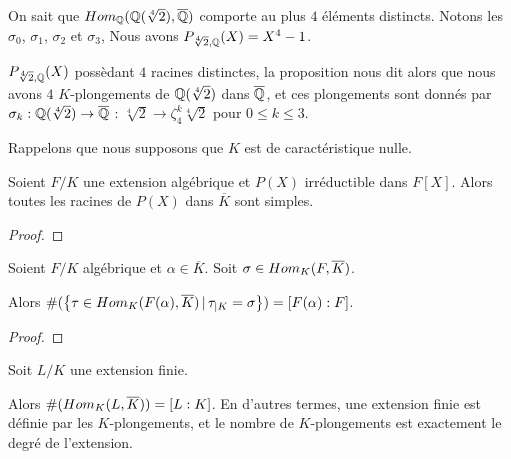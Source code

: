 \begin{exemple}
	On sait que
	$Hom_{\mathbb{Q}}(\mathbb{Q}(\sqrt[4]{2}), \overline{\mathbb{Q}})$
	comporte au plus $4$ éléments distincts. Notons les $\sigma_{0}$, $\sigma_{1}$,
	$\sigma_{2}$ et $\sigma_{3}$,
	Nous avons $P_{\sqrt[4]{2}, \mathbb{Q}}(X) = X^{4} - 1$.

	$P_{\sqrt[4]{2}, \mathbb{Q}}(X)$ possèdant $4$ racines distinctes, la
	proposition nous dit alors que nous avons $4$
	$K$-plongements de $\mathbb{Q}(\sqrt[4]{2})$ dans $\overline{\mathbb{Q}}$, et
	ces plongements sont donnés par
	$\sigma_{k} : \mathbb{Q}(\sqrt[4]{2}) \rightarrow \overline{\mathbb{Q}}$ :
	$\sqrt[4]{2} \rightarrow \zeta^{k}_{4} \sqrt[4]{2}$ pour $0 \leq k \leq 3$.
\end{exemple}

\begin{proposition}
	Rappelons que nous supposons que $K$ est de caractéristique nulle.

	Soient $F/K$ une extension algébrique et $P(X)$ irréductible dans $F[X]$.
	Alors toutes les racines de $P(X)$ dans $\overline{K}$ sont simples.
\end{proposition}

\ifdefined\outputproof
\begin{proof}

\end{proof}
\fi

\begin{corollary}
	Soient $F/K$ algébrique et $\alpha \in \overline{K}$.
	Soit $\sigma \in Hom_{K}(F, \overline{K})$.

	Alors $\#(\left\{\tau \in Hom_{K}(F(\alpha), \overline{K}) \, | \, \tau_{|K} =
\sigma \right\}) = [F(\alpha) : F]$.
\end{corollary}

\ifdefined\outputproof
\begin{proof}

\end{proof}
\fi

\begin{proposition}
	\label{prop:k-plongement_degree_extension}
	Soit $L/K$ une extension finie.

	Alors $\#(Hom_{K}(L, \overline{K})) = [L : K]$.
	En d'autres termes, une extension finie est définie par les $K$-plongements,
	et le nombre de $K$-plongements est exactement le degré de l'extension.
\end{proposition}

